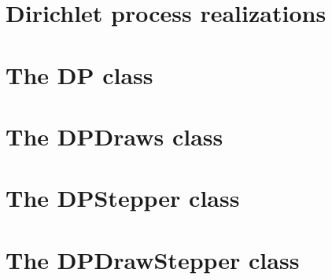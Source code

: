 \documentclass{manual}
\begin{document}
\chapter{Dirichlet process realizations}

\chapter{The DP class}

\chapter{The DPDraws class}

\chapter{The DPStepper class}

\chapter{The DPDrawStepper class}
\end{document}
